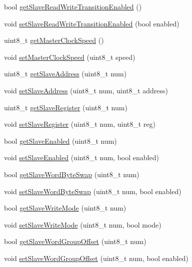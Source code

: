 \begin{DoxyCompactItemize}
\item 
bool \hyperlink{class_m_p_u6050_a6b3c3aab80fcaa384303f9df2a59d7eb}{get\+Slave\+Read\+Write\+Transition\+Enabled} ()
\item 
void \hyperlink{class_m_p_u6050_a3413efbf2f4e8a27aa8768d9bc34d663}{set\+Slave\+Read\+Write\+Transition\+Enabled} (bool enabled)
\item 
uint8\+\_\+t \hyperlink{class_m_p_u6050_a4cda448ef5c5736bd14188947342d636}{get\+Master\+Clock\+Speed} ()
\item 
void \hyperlink{class_m_p_u6050_a8a4779ea709ff0633f9798369478400b}{set\+Master\+Clock\+Speed} (uint8\+\_\+t speed)
\item 
uint8\+\_\+t \hyperlink{class_m_p_u6050_af75b9f7ccac48515c7544238db0e6863}{get\+Slave\+Address} (uint8\+\_\+t num)
\item 
void \hyperlink{class_m_p_u6050_a3c07eb2c59fff3ddc7186319ee40ba6f}{set\+Slave\+Address} (uint8\+\_\+t num, uint8\+\_\+t address)
\item 
uint8\+\_\+t \hyperlink{class_m_p_u6050_ae7e9ead9645bcef326eb579c6ab5d5ff}{get\+Slave\+Register} (uint8\+\_\+t num)
\item 
void \hyperlink{class_m_p_u6050_a62851e982059a2462d52c210ad764a1c}{set\+Slave\+Register} (uint8\+\_\+t num, uint8\+\_\+t reg)
\item 
bool \hyperlink{class_m_p_u6050_a5f14bde83fe00b27dec6776fc44e89c2}{get\+Slave\+Enabled} (uint8\+\_\+t num)
\item 
void \hyperlink{class_m_p_u6050_afaffa021d7bb41f3a288827080602eee}{set\+Slave\+Enabled} (uint8\+\_\+t num, bool enabled)
\item 
bool \hyperlink{class_m_p_u6050_a18e8f3d053a68f0e5ecf497c87ecac8a}{get\+Slave\+Word\+Byte\+Swap} (uint8\+\_\+t num)
\item 
void \hyperlink{class_m_p_u6050_abeb1f83652066d7543fd3283af794364}{set\+Slave\+Word\+Byte\+Swap} (uint8\+\_\+t num, bool enabled)
\item 
bool \hyperlink{class_m_p_u6050_adb99955fa66300b1f0bedfcdd8187412}{get\+Slave\+Write\+Mode} (uint8\+\_\+t num)
\item 
void \hyperlink{class_m_p_u6050_a3d9bfcb5394c7a382009cd2dc91ce801}{set\+Slave\+Write\+Mode} (uint8\+\_\+t num, bool mode)
\item 
bool \hyperlink{class_m_p_u6050_a32ce8023bb80afc5d55811de70c7214f}{get\+Slave\+Word\+Group\+Offset} (uint8\+\_\+t num)
\item 
void \hyperlink{class_m_p_u6050_a32602ab86f70b70d3313628fc6c010ae}{set\+Slave\+Word\+Group\+Offset} (uint8\+\_\+t num, bool enabled)

\end{DoxyCompactItemize}
